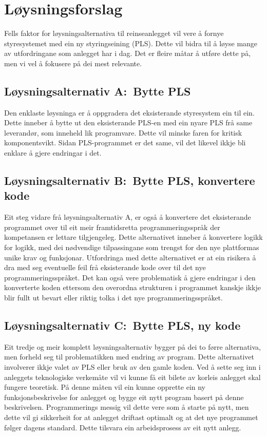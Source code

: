\newpage
\section{Løysningsforslag}

Fells faktor for løysningsalternativa til reinseanlegget vil vere å fornye
styresystemet med ein ny styringseining (PLS). 
Dette vil bidra til å løyse mange av utfordringane som anlegget har i dag.
Det er fleire måtar å utføre dette på, men vi vel å fokusere på dei mest relevante.

\subsection{Løysningsalternativ A:~Bytte PLS}
Den enklaste løysninga er å oppgradera det eksisterande styresystem ein til ein. 
Dette inneber å bytte ut den eksisterande PLS-en med ein nyare PLS frå same leverandør, som inneheld lik programvare.
Dette vil minske faren for kritisk komponentsvikt. Sidan PLS-programmet er det same, 
vil det likevel ikkje bli enklare å gjere endringar i det.

\subsection{Løysningsalternativ B:~Bytte PLS, konvertere kode}
Eit steg vidare frå løysningsalternativ A, er også å konvertere det eksisterande programmet over til eit meir
framtidsretta programmeringsspråk der kompetansen er lettare tilgjengeleg. Dette alternativet inneber å konvertere logikk for logikk,
med dei nødvendige tilpassingane som trengst for den nye plattformas unike krav og funksjonar.
\newline \newline
Utfordringa med dette alternativet er at ein risikera å dra med seg eventuelle feil frå eksisterande
kode over til det nye programmeringsspråket. Det kan også vere problematisk å gjere endringar
i den konverterte koden ettersom den overordna strukturen i programmet
kanskje ikkje blir fullt ut bevart eller riktig tolka i det nye programmeringsspråket.

\subsection{Løysningsalternativ C:~Bytte PLS, ny kode}
Eit tredje og meir komplett løysningsalternativ bygger på dei to førre alternativa, men forheld seg til problematikken med endring av program.
Dette alternativet involverer ikkje valet av PLS eller bruk av den gamle koden.
\newline \newline
Ved å sette seg inn i anleggets teknologiske verkemåte vil vi kunne få eit bilete av korleis anlegget skal fungere teoretisk.
På denne måten vil ein kunne opprette ein ny funksjonsbeskrivelse for anlegget og bygge eit nytt program basert på denne beskrivelsen.
Programmerings messig vil dette vere som å starte på nytt, men dette vil gi sikkerheit for at anlegget driftast optimalt og at det nye programmet følger
dagens standard. Dette tilsvara ein arbeidsprosess av eit nytt anlegg.

